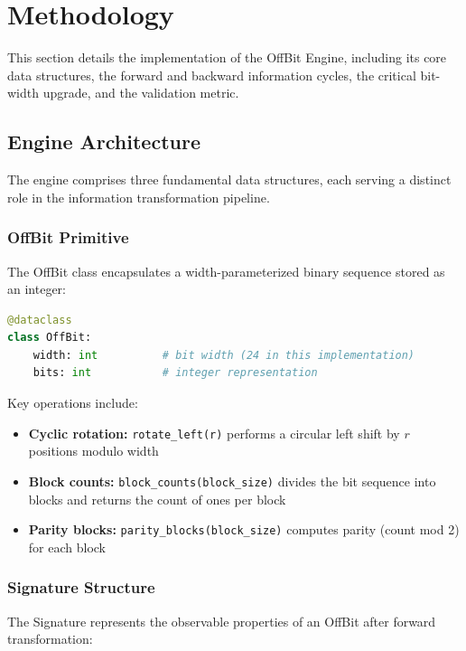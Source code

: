 \documentclass[11pt,letterpaper]{article}
\begin{document}
\section{Methodology}
\label{sec:methodology}

This section details the implementation of the OffBit Engine, including its core data structures, the forward and backward information cycles, the critical bit-width upgrade, and the validation metric.

\subsection{Engine Architecture}
\label{subsec:architecture}

The engine comprises three fundamental data structures, each serving a distinct role in the information transformation pipeline.

\subsubsection{OffBit Primitive}

The OffBit class encapsulates a width-parameterized binary sequence stored as an integer:

\begin{lstlisting}[language=Python]
@dataclass
class OffBit:
    width: int          # bit width (24 in this implementation)
    bits: int           # integer representation
\end{lstlisting}

Key operations include:
\begin{itemize}
    \item \textbf{Cyclic rotation:} \texttt{rotate\_left(r)} performs a circular left shift by $r$ positions modulo width
    \item \textbf{Block counts:} \texttt{block\_counts(block\_size)} divides the bit sequence into blocks and returns the count of ones per block
    \item \textbf{Parity blocks:} \texttt{parity\_blocks(block\_size)} computes parity (count mod 2) for each block
\end{itemize}

\subsubsection{Signature Structure}

The Signature represents the observable properties of an OffBit after forward transformation:
\end{document}
